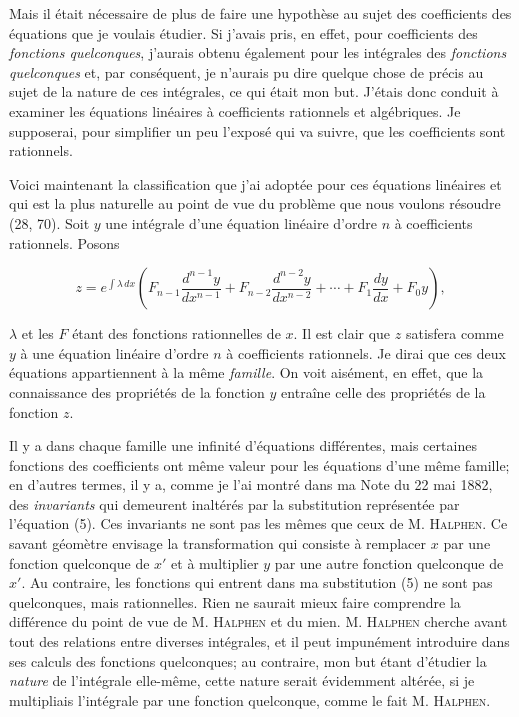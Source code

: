 \documentclass[11pt]{article}
\begin{document}
Mais il était nécessaire de plus de faire une hypothèse au sujet des coefficients des équations que je voulais étudier. Si j’avais pris, en effet, pour coefficients des \emph{fonctions quelconques}, j’aurais obtenu également pour les intégrales des \emph{fonctions quelconques} et, par conséquent, je n’aurais pu dire quelque chose de précis au sujet de la nature de ces intégrales, ce qui était mon but. J’étais donc conduit à examiner les équations linéaires à coefficients rationnels et algébriques. Je supposerai, pour simplifier un peu l’exposé qui va suivre, que les coefficients sont rationnels.

Voici maintenant la classification que j’ai adoptée pour ces équations linéaires et qui est la plus naturelle au point de vue du problème que nous voulons résoudre (28, 70). Soit $y$ une intégrale d’une équation linéaire d’ordre $n$ à coefficients rationnels. Posons

\begin{equation}
 z=e^{\int \lambda\,dx}\left(F_{n-1}\frac{d^{n-1}y}{dx^{n-1}}+F_{n-2}\frac{d^{n-2}y}{dx^{n-2}}+\cdots+F_1\frac{dy}{dx}+F_0y\right),
\tag{5}
\end{equation}

$\lambda$ et les $F$ étant des fonctions rationnelles de $x$. Il est clair que $z$ satisfera comme $y$ à une équation linéaire d’ordre $n$ à coefficients rationnels. Je dirai que ces deux équations appartiennent à la même \emph{famille}. On voit aisément, en effet, que la connaissance des propriétés de la fonction $y$ entraîne celle des propriétés de la fonction $z$.

Il y a dans chaque famille une infinité d’équations différentes, mais certaines fonctions des coefficients ont même valeur pour les équations d’une même famille; en d’autres termes, il y a, comme je l’ai montré dans ma Note du 22 mai 1882, des \emph{invariants} qui demeurent inaltérés par la substitution représentée par l’équation (5). Ces invariants ne sont pas les mêmes que ceux de M. \textsc{Halphen}. Ce savant géomètre envisage la transformation qui consiste à remplacer $x$ par une fonction quelconque de $x'$ et à multiplier $y$ par une autre fonction quelconque de $x'$. Au contraire, les fonctions qui entrent dans ma substitution (5) ne sont pas quelconques, mais rationnelles. Rien ne saurait mieux faire comprendre la différence du point de vue de M. \textsc{Halphen} et du mien. M. \textsc{Halphen} cherche avant tout des relations entre diverses intégrales, et il peut impunément introduire dans ses calculs des fonctions quelconques; au contraire, mon but étant d’étudier la \emph{nature} de l’intégrale elle-même, cette nature serait évidemment altérée, si je multipliais l’intégrale par une fonction quelconque, comme le fait M. \textsc{Halphen}.
\end{document}
